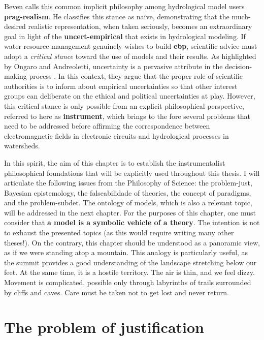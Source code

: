 \documentclass[./main_en.tex]{subfiles}
\begin{document}
\par Beven calls this common implicit philosophy among hydrological model users \textbf{\gls{prag-realism}}. He classifies this stance as naïve, demonstrating that the much-desired realistic representation, when taken seriously, becomes an extraordinary goal in light of the \textbf{\gls{uncert-empirical}} that exists in hydrological modeling. If water resource management genuinely wishes to build \textbf{\gls{ebp}}, scientific advice must adopt a \textit{critical stance} toward the use of models and their results. As highlighted by Ongaro and Andreoletti, uncertainty is a pervasive attribute in the decision-making process \cite{Ongaro2022}. In this context, they argue that the proper role of scientific authorities is to inform about empirical uncertainties so that other interest groups can deliberate on the ethical and political uncertainties at play. However, this critical stance is only possible from an explicit philosophical perspective, referred to here as \textbf{\gls{instrument}}, which brings to the fore several problems that need to be addressed before affirming the correspondence between electromagnetic fields in electronic circuits and hydrological processes in watersheds.

\par In this spirit, the aim of this chapter is to establish the instrumentalist philosophical foundations that will be explicitly used throughout this thesis. I will articulate the following issues from the Philosophy of Science: the \gls{problem-just}, Bayesian epistemology, the \gls{falseabilidade} of theories, the concept of paradigms, and the \gls{problem-subdet}. The ontology of models, which is also a relevant topic, will be addressed in the next chapter. For the purposes of this chapter, one must consider that \textbf{a \gls{model} is a symbolic vehicle of a theory}. The intention is not to exhaust the presented topics (as this would require writing many other theses!). On the contrary, this chapter should be understood as a panoramic view, as if we were standing atop a mountain. This \gls{analogy} is particularly useful, as the summit provides a good understanding of the landscape stretching below our feet. At the same time, it is a hostile territory. The air is thin, and we feel dizzy. Movement is complicated, possible only through labyrinths of trails surrounded by cliffs and caves. Care must be taken not to get lost and never return.

\section{The problem of justification} \label{sec:epis:justific}
\end{document}
